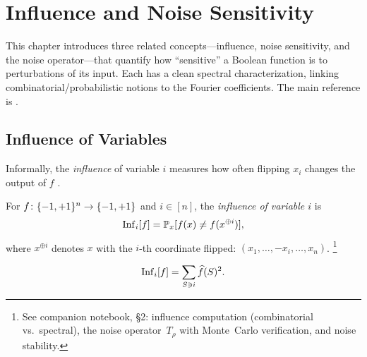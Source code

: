 
\chapter{Influence and Noise Sensitivity}\label{ch:influence-noise}

This chapter introduces three related concepts---influence, noise
sensitivity, and the noise operator---that quantify how ``sensitive'' a
Boolean function is to perturbations of its input. Each has a clean
spectral characterization, linking combinatorial/probabilistic notions to
the Fourier coefficients. The main reference is
\citet[Chapters~2--3]{odonnell2014analysis}.

\section{Influence of Variables}\label{sec:influence}

Informally, the \emph{influence} of variable $i$ measures how often
flipping $x_i$ changes the output of $f$
\citep[\S2.2]{odonnell2014analysis}.

\begin{definition}[Influence]\label{def:influence}
For $f \colon \{-1,+1\}^n \to \{-1,+1\}$ and $i \in [n]$, the \emph{influence
of variable $i$} is
\begin{equation}\label{eq:influence-def}
  \operatorname{Inf}_i[f] = \mathbb{P}_x[f(x) \neq f(x^{\oplus i})],
\end{equation}
where $x^{\oplus i}$ denotes $x$ with the $i$-th coordinate flipped:
$(x_1, \ldots, -x_i, \ldots, x_n)$.%
\footnote{See companion notebook, \S2: influence computation
(combinatorial vs.\ spectral), the noise operator~$T_\rho$ with
Monte~Carlo verification, and noise stability.}
\end{definition}

\begin{theorem}\label{thm:influence-spectral}
\begin{equation}\label{eq:influence-spectral}
  \operatorname{Inf}_i[f] = \sum_{S \ni i} \widehat{f}(S)^2.
\end{equation}
\end{theorem}

